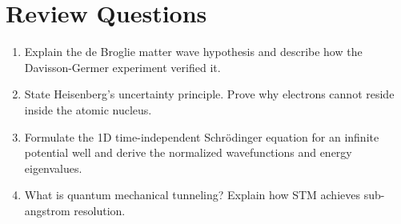 \section{Review Questions}
\begin{enumerate}[leftmargin=*,itemsep=3pt]
    \item Explain the de Broglie matter wave hypothesis and describe how the Davisson-Germer experiment verified it.
    \item State Heisenberg's uncertainty principle. Prove why electrons cannot reside inside the atomic nucleus.
    \item Formulate the 1D time-independent Schrödinger equation for an infinite potential well and derive the normalized wavefunctions and energy eigenvalues.
    \item What is quantum mechanical tunneling? Explain how STM achieves sub-angstrom resolution.
\end{enumerate}
